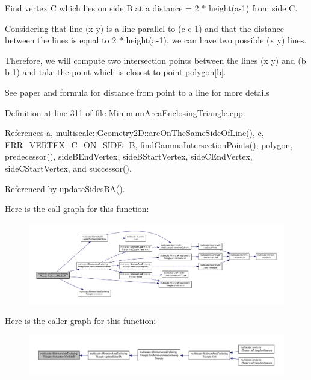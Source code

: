 Find vertex C which lies on side B at a distance = 2 $\ast$ height(a-\/1) from side C. 

Considering that line (x y) is a line parallel to (c c-\/1) and that the distance between the lines is equal to 2 $\ast$ height(a-\/1), we can have two possible (x y) lines.

Therefore, we will compute two intersection points between the lines (x y) and (b b-\/1) and take the point which is closest to point polygon\mbox{[}b\mbox{]}.

See paper and formula for distance from point to a line for more details 

Definition at line 311 of file Minimum\-Area\-Enclosing\-Triangle.\-cpp.



References a, multiscale\-::\-Geometry2\-D\-::are\-On\-The\-Same\-Side\-Of\-Line(), c, E\-R\-R\-\_\-\-V\-E\-R\-T\-E\-X\-\_\-\-C\-\_\-\-O\-N\-\_\-\-S\-I\-D\-E\-\_\-\-B, find\-Gamma\-Intersection\-Points(), polygon, predecessor(), side\-B\-End\-Vertex, side\-B\-Start\-Vertex, side\-C\-End\-Vertex, side\-C\-Start\-Vertex, and successor().



Referenced by update\-Sides\-B\-A().



Here is the call graph for this function\-:\nopagebreak
\begin{figure}[H]
\begin{center}
\leavevmode
\includegraphics[width=350pt]{classmultiscale_1_1MinimumAreaEnclosingTriangle_aa0e5813de41cf0415f687d6c6371699c_cgraph}
\end{center}
\end{figure}




Here is the caller graph for this function\-:\nopagebreak
\begin{figure}[H]
\begin{center}
\leavevmode
\includegraphics[width=350pt]{classmultiscale_1_1MinimumAreaEnclosingTriangle_aa0e5813de41cf0415f687d6c6371699c_icgraph}
\end{center}
\end{figure}


